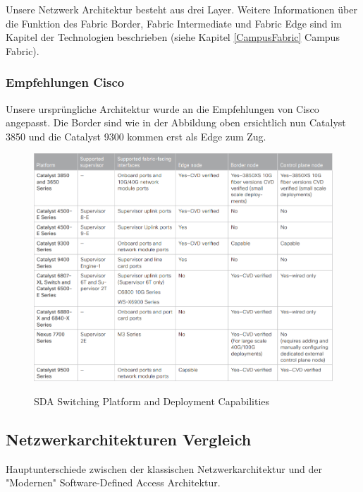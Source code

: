 Unsere Netzwerk Architektur besteht aus drei Layer. Weitere Informationen über die Funktion des Fabric Border, Fabric Intermediate und Fabric Edge sind im Kapitel der Technologien beschrieben (siehe Kapitel \ref{CampusFabric} Campus Fabric).

\subsubsection{Empfehlungen Cisco}
Unsere ursprüngliche Architektur wurde an die Empfehlungen von Cisco angepasst. Die Border sind wie in der Abbildung oben ersichtlich nun Catalyst 3850 und die Catalyst 9300 kommen erst als Edge zum Zug.
\begin{figure}[H]
	\centering
	\includegraphics[width=1\linewidth]{img/SDA-switchingplatformanddeploymentcapabilities.png}\\[1px]
	\caption{SDA Switching Platform and Deployment Capabilities \cite{sda-designguide}}
	\label{fig:SDA Switching Platform and Deployment Capabilities}
\end{figure}

\subsection{Netzwerkarchitekturen Vergleich}
Hauptunterschiede zwischen der klassischen Netzwerkarchitektur und der "Modernen" Software-Defined Access Architektur. 

